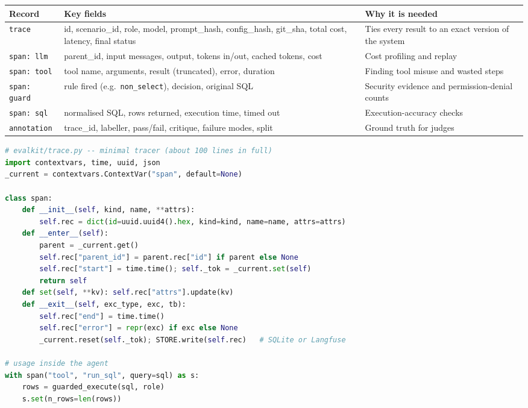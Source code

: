 \documentclass[11pt,a4paper]{article}
\newcommand{\code}[1]{\texttt{\small #1}}
\begin{document}
\begin{center}
\small
\begin{tabularx}{\linewidth}{@{}l X X@{}}
\toprule
\textbf{Record} & \textbf{Key fields} & \textbf{Why it is needed}\\
\midrule
\code{trace} & id, scenario\_id, role, model, prompt\_hash, config\_hash, git\_sha, total cost, latency, final status & Ties every result to an exact version of the system\\
\code{span: llm} & parent\_id, input messages, output, tokens in/out, cached tokens, cost & Cost profiling and replay\\
\code{span: tool} & tool name, arguments, result (truncated), error, duration & Finding tool misuse and wasted steps\\
\code{span: guard} & rule fired (e.g.\ \code{non\_select}), decision, original SQL & Security evidence and permission-denial counts\\
\code{span: sql} & normalised SQL, rows returned, execution time, timed out & Execution-accuracy checks\\
\code{annotation} & trace\_id, labeller, pass/fail, critique, failure modes, split & Ground truth for judges\\
\bottomrule
\end{tabularx}
\end{center}

\begin{lstlisting}[language=Python]
# evalkit/trace.py -- minimal tracer (about 100 lines in full)
import contextvars, time, uuid, json
_current = contextvars.ContextVar("span", default=None)

class span:
    def __init__(self, kind, name, **attrs):
        self.rec = dict(id=uuid.uuid4().hex, kind=kind, name=name, attrs=attrs)
    def __enter__(self):
        parent = _current.get()
        self.rec["parent_id"] = parent.rec["id"] if parent else None
        self.rec["start"] = time.time(); self._tok = _current.set(self)
        return self
    def set(self, **kv): self.rec["attrs"].update(kv)
    def __exit__(self, exc_type, exc, tb):
        self.rec["end"] = time.time()
        self.rec["error"] = repr(exc) if exc else None
        _current.reset(self._tok); STORE.write(self.rec)   # SQLite or Langfuse

# usage inside the agent
with span("tool", "run_sql", query=sql) as s:
    rows = guarded_execute(sql, role)
    s.set(n_rows=len(rows))
\end{lstlisting}
\end{document}
